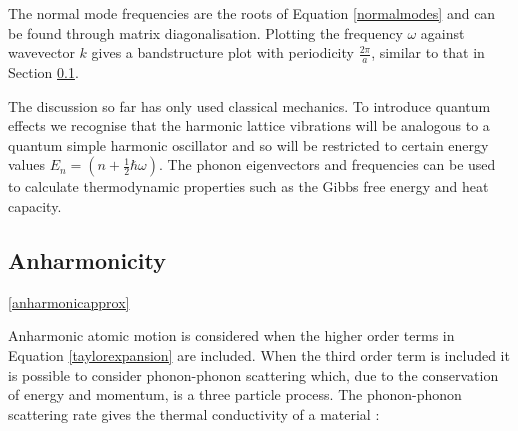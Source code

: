 The normal mode frequencies are the roots of Equation \ref{normalmodes} and can be found through matrix diagonalisation. Plotting the frequency $\omega$ against wavevector $k$ gives a bandstructure plot with periodicity $\frac{2\pi}{a}$, similar to that in Section \ref{}.   %

The discussion so far has only used classical mechanics. To introduce quantum effects we recognise that the harmonic lattice vibrations will be analogous to a quantum simple harmonic oscillator and so will be restricted to certain energy values $E_n = (n+\frac{1}{2}\hbar\omega)$.
The phonon eigenvectors and frequencies can be used to calculate thermodynamic properties such as the Gibbs free energy and heat capacity.



\subsection{Anharmonicity} \ref{anharmonicapprox}

Anharmonic atomic motion is considered when the higher order terms in Equation \ref{taylorexpansion} are included.
When the third order term is included it is possible to consider phonon-phonon scattering which, due to the conservation of energy and momentum, is a three particle process.%
The phonon-phonon scattering rate gives the thermal conductivity of a material :




